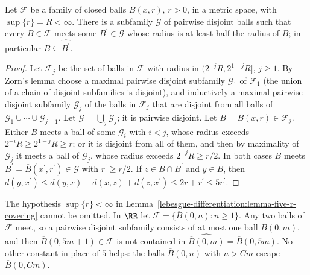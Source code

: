 \begin{lemma}\label{lebesgue-differentiation:lemma-five-r-covering}
Let $\mathcal{F}$ be a family of closed balls $\overline{B}(x, r)$, $r > 0$, in a metric space, with $\sup\{r\} = R < \infty$. There is a subfamily $\mathcal{G}$ of pairwise disjoint balls such that every
$B \in \mathcal{F}$ meets some $B^{\prime} \in \mathcal{G}$ whose radius is at least half the radius of $B$; in particular $B \subseteq \widehat{B^{\prime}}$.
\end{lemma}

\begin{proof}
Let $\mathcal{F}_j$ be the set of balls in $\mathcal{F}$ with radius in $(2^{-j}R, 2^{1-j}R]$, $j \geq 1$. By Zorn's lemma choose a maximal pairwise disjoint subfamily $\mathcal{G}_1$ of $\mathcal{F}_1$ (the union of a chain of
disjoint subfamilies is disjoint), and inductively a maximal pairwise disjoint subfamily $\mathcal{G}_j$ of the balls in $\mathcal{F}_j$ that are disjoint from all balls of
$\mathcal{G}_1 \cup \cdots \cup \mathcal{G}_{j-1}$. Let $\mathcal{G} = \bigcup_j\mathcal{G}_j$; it is pairwise disjoint. Let $B = \overline{B}(x, r) \in \mathcal{F}_j$. Either $B$ meets a ball of some $\mathcal{G}_i$ with $i < j$,
whose radius exceeds $2^{-i}R \geq 2^{1-j}R \geq r$; or it is disjoint from all of them, and then by maximality of $\mathcal{G}_j$ it meets a ball of $\mathcal{G}_j$, whose radius exceeds $2^{-j}R \geq r/2$. In both
cases $B$ meets $B^{\prime} = \overline{B}(x^{\prime}, r^{\prime}) \in \mathcal{G}$ with $r^{\prime} \geq r/2$. If $z \in B \cap B^{\prime}$ and $y \in B$, then
$d(y, x^{\prime}) \leq d(y, x) + d(x, z) + d(z, x^{\prime}) \leq 2r + r^{\prime} \leq 5r^{\prime}$.
\end{proof}

\begin{counterexample}\label{lebesgue-differentiation:counterexample-five-r-unbounded}
The hypothesis $\sup\{r\} < \infty$ in Lemma~\ref{lebesgue-differentiation:lemma-five-r-covering} cannot be omitted. In $\RR$ let $\mathcal{F} = \{\overline{B}(0, n) : n \geq 1\}$. Any two balls of
$\mathcal{F}$ meet, so a pairwise disjoint subfamily consists of at most one ball $\overline{B}(0, m)$, and then $\overline{B}(0, 5m + 1) \in \mathcal{F}$ is not contained in
$\widehat{\overline{B}(0, m)} = \overline{B}(0, 5m)$. No other constant in place of $5$ helps: the balls $\overline{B}(0, n)$ with $n > Cm$ escape $\overline{B}(0, Cm)$.
\end{counterexample}

